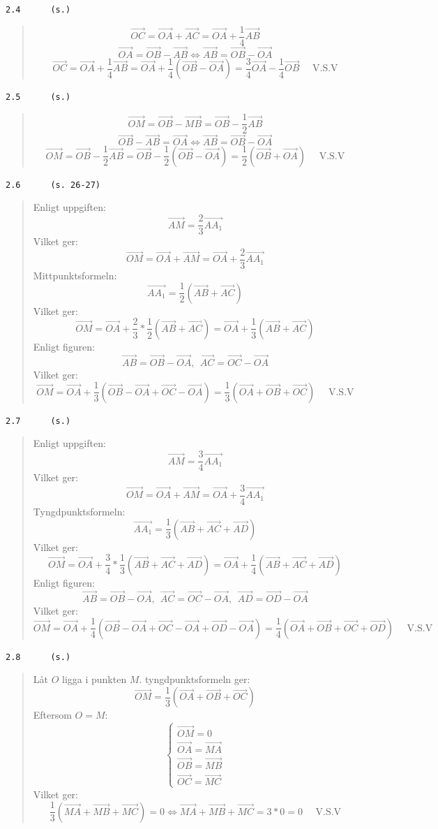 \documentclass[a4paper]{article}
\newcommand{\tskcol}[1]{\textcolor{tskcol}{#1}}
\newcommand{\vek}[1]{\overrightarrow{#1}}
\begin{document}
\texttt{\tskcol{2.4~~~~~ (s.)}}
\begin{quotation}
	\noindent
	\[\vek{OC}=\vek{OA}+\vek{AC}=\vek{OA}+\frac{1}{4}\vek{AB}\]
	\[\vek{OA}=\vek{OB}-\vek{AB} \Leftrightarrow
	\vek{AB}=\vek{OB}-\vek{OA}\]
	\[\vek{OC}=
	\vek{OA}+\frac{1}{4}\vek{AB}=
	\vek{OA}+\frac{1}{4}(\vek{OB}-\vek{OA})=
	\frac{3}{4}\vek{OA}-\frac{1}{4}\vek{OB} \text{~~~~V.S.V}\]
\end{quotation}

\texttt{\tskcol{2.5~~~~~ (s.)}}
\begin{quotation}
	\noindent
	\[\vek{OM}=\vek{OB}-\vek{MB}=\vek{OB}-\frac{1}{2}\vek{AB}\]
	\[\vek{OB}-\vek{AB}=\vek{OA}\Leftrightarrow
	\vek{AB}=\vek{OB}-\vek{OA}\]
	\[\vek{OM}=
	\vek{OB}-\frac{1}{2}\vek{AB}=
	\vek{OB}-\frac{1}{2}(\vek{OB}-\vek{OA})=
	\frac{1}{2}(\vek{OB}+\vek{OA}) \text{~~~~V.S.V}\]
\end{quotation}

\pagebreak
\texttt{\tskcol{2.6~~~~~ (s. 26-27)}}
\begin{quotation}
	\noindent
	Enligt uppgiften:
	\[\vek{AM}=\frac{2}{3}\vek{AA_1}\]
	Vilket ger:
	\[\vek{OM}=
	\vek{OA}+\vek{AM}=
	\vek{OA}+\frac{2}{3}\vek{AA_1}\]
	Mittpunktsformeln:
	\[\vek{AA_1}=\frac{1}{2}(\vek{AB}+\vek{AC})\]
	Vilket ger:
	\[\vek{OM}=
	\vek{OA}+\frac{2}{3}*\frac{1}{2}(\vek{AB}+\vek{AC})=
	\vek{OA}+\frac{1}{3}(\vek{AB}+\vek{AC})\]
	Enligt figuren:
	\[\vek{AB}=\vek{OB}-\vek{OA},~~
	\vek{AC}=\vek{OC}-\vek{OA}\]
	Vilket ger:
	\[\vek{OM}=
	\vek{OA}+\frac{1}{3}(\vek{OB}-\vek{OA}+\vek{OC}-\vek{OA})=
	\frac{1}{3}(\vek{OA}+\vek{OB}+\vek{OC}) \text{~~~~V.S.V}\]
\end{quotation}

\texttt{\tskcol{2.7~~~~~ (s.)}}
\begin{quotation}
	\noindent
	Enligt uppgiften:
	\[\vek{AM}=\frac{3}{4}\vek{AA_1}\]
	Vilket ger:
	\[\vek{OM}=
	\vek{OA}+\vek{AM}=
	\vek{OA}+\frac{3}{4}\vek{AA_1}\]
	Tyngdpunktsformeln:
	\[\vek{AA_1}=\frac{1}{3}(\vek{AB}+\vek{AC}+\vek{AD})\]
	Vilket ger:
	\[\vek{OM}=
	\vek{OA}+\frac{3}{4}*\frac{1}{3}(\vek{AB}+\vek{AC}+\vek{AD})=
	\vek{OA}+\frac{1}{4}(\vek{AB}+\vek{AC}+\vek{AD})\]
	Enligt figuren:
	\[\vek{AB}=\vek{OB}-\vek{OA},~~
	\vek{AC}=\vek{OC}-\vek{OA},~~
	\vek{AD}=\vek{OD}-\vek{OA}\]
	Vilket ger:
	\[\vek{OM}=
	\vek{OA}+\frac{1}{4}(\vek{OB}-\vek{OA}+\vek{OC}-\vek{OA}+\vek{OD}-\vek{OA})=
	\frac{1}{4}(\vek{OA}+\vek{OB}+\vek{OC}+\vek{OD}) \text{~~~~V.S.V}\]
\end{quotation}

\pagebreak
\texttt{\tskcol{2.8~~~~~ (s.)}}
\begin{quotation}
	\noindent
	Låt $O$ ligga i punkten $M$. tyngdpunktsformeln ger:
	\[\vek{OM}=\frac{1}{3}(\vek{OA}+\vek{OB}+\vek{OC})\]
	Eftersom $O=M$:
	\[\begin{cases}
	\vek{OM}=0 \\
	\vek{OA}=\vek{MA} \\
	\vek{OB}=\vek{MB} \\
	\vek{OC}=\vek{MC}
	\end{cases}\]
	Vilket ger:
	\[\frac{1}{3}(\vek{MA}+\vek{MB}+\vek{MC})=0 \Leftrightarrow
	\vek{MA}+\vek{MB}+\vek{MC}=3*0=0 \text{~~~~V.S.V}\]
\end{quotation}
\end{document}

